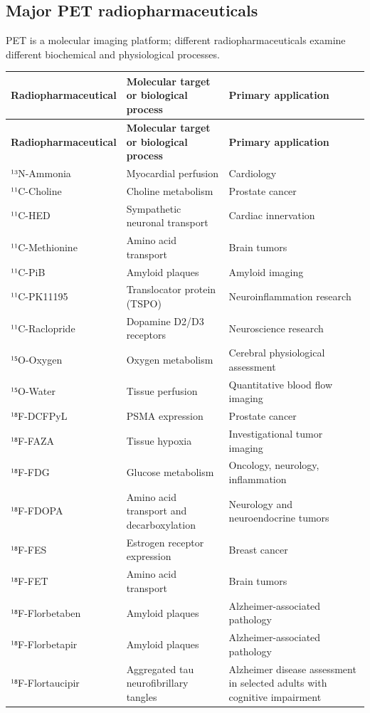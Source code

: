 \subsection{Major PET radiopharmaceuticals}
PET is a molecular imaging platform; different radiopharmaceuticals examine different biochemical and physiological processes.
\begin{longtable}{@{}p{}p{}p{}@{}}
\toprule
\textbf{Radiopharmaceutical} & \textbf{Molecular target or biological process} & \textbf{Primary application} \\
\midrule
\endfirsthead
\toprule
\textbf{Radiopharmaceutical} & \textbf{Molecular target or biological process} & \textbf{Primary application} \\
\midrule
\endhead
¹³N-Ammonia & Myocardial perfusion & Cardiology \\
¹¹C-Choline & Choline metabolism & Prostate cancer \\
¹¹C-HED & Sympathetic neuronal transport & Cardiac innervation \\
¹¹C-Methionine & Amino acid transport & Brain tumors \\
¹¹C-PiB & Amyloid plaques & Amyloid imaging \\
¹¹C-PK11195 & Translocator protein (TSPO) & Neuroinflammation research \\
¹¹C-Raclopride & Dopamine D2/D3 receptors & Neuroscience research \\
¹⁵O-Oxygen & Oxygen metabolism & Cerebral physiological assessment \\
¹⁵O-Water & Tissue perfusion & Quantitative blood flow imaging \\
¹⁸F-DCFPyL & PSMA expression & Prostate cancer \\
¹⁸F-FAZA & Tissue hypoxia & Investigational tumor imaging \\
¹⁸F-FDG & Glucose metabolism & Oncology, neurology, inflammation \\
¹⁸F-FDOPA & Amino acid transport and decarboxylation & Neurology and neuroendocrine tumors \\
¹⁸F-FES & Estrogen receptor expression & Breast cancer \\
¹⁸F-FET & Amino acid transport & Brain tumors \\
¹⁸F-Florbetaben & Amyloid plaques & Alzheimer-associated pathology \\
¹⁸F-Florbetapir & Amyloid plaques & Alzheimer-associated pathology \\
¹⁸F-Flortaucipir & Aggregated tau neurofibrillary tangles & Alzheimer disease assessment in selected adults with cognitive impairment \\

\end{longtable}
